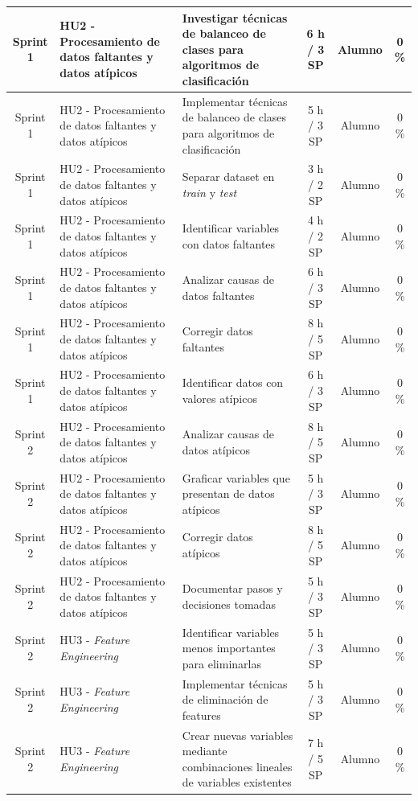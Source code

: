 \documentclass[
11pt, %
]{charter}
\begin{document}
\begin{xltabular}{\linewidth}{@{}|c|X|X|c|c|c|@{}}
Sprint 1 & HU2 - Procesamiento de datos faltantes y datos atípicos & Investigar técnicas de balanceo de clases para algoritmos de clasificación  & 6 h / 3 SP & Alumno & 0 \% \\ \hline
Sprint 1 & HU2 - Procesamiento de datos faltantes y datos atípicos & Implementar técnicas de balanceo de clases para algoritmos de clasificación  & 5 h / 3 SP & Alumno & 0 \% \\ \hline
Sprint 1 & HU2 - Procesamiento de datos faltantes y datos atípicos & Separar dataset en \textit{train} y \textit{test}  & 3 h / 2 SP & Alumno & 0 \% \\ \hline
Sprint 1 & HU2 - Procesamiento de datos faltantes y datos atípicos & Identificar variables con datos faltantes  & 4 h / 2 SP & Alumno & 0 \%\\ \hline
Sprint 1 & HU2 - Procesamiento de datos faltantes y datos atípicos & Analizar causas de datos faltantes  & 6 h / 3 SP & Alumno & 0 \%\\ \hline
Sprint 1 & HU2 - Procesamiento de datos faltantes y datos atípicos & Corregir datos faltantes  & 8 h / 5 SP & Alumno & 0 \%\\ \hline
Sprint 1 & HU2 - Procesamiento de datos faltantes y datos atípicos & Identificar datos con valores atípicos  & 6 h / 3 SP & Alumno & 0 \%\\ \hline
Sprint 2 & HU2 - Procesamiento de datos faltantes y datos atípicos & Analizar causas de datos atípicos  & 8 h / 5 SP & Alumno & 0 \%\\ \hline
Sprint 2 & HU2 - Procesamiento de datos faltantes y datos atípicos & Graficar variables que presentan de datos atípicos  & 5 h / 3 SP & Alumno & 0 \% \\ \hline
Sprint 2 & HU2 - Procesamiento de datos faltantes y datos atípicos & Corregir datos atípicos  & 8 h / 5 SP & Alumno & 0 \%\\ \hline
Sprint 2 & HU2 - Procesamiento de datos faltantes y datos atípicos & Documentar pasos y decisiones tomadas  & 5 h / 3 SP & Alumno & 0 \% \\ \hline
Sprint 2 & HU3 - \textit{Feature Engineering}  & Identificar variables menos importantes para eliminarlas  & 5 h / 3 SP & Alumno & 0 \%\\ \hline
Sprint 2 & HU3 - \textit{Feature Engineering}  & Implementar técnicas de eliminación de features  & 5 h / 3 SP & Alumno & 0 \% \\ \hline
Sprint 2 & HU3 - \textit{Feature Engineering}  & Crear nuevas variables mediante combinaciones lineales de variables existentes  & 7 h / 5 SP & Alumno & 0 \%\\ \hline

\end{xltabular}
\end{document}
